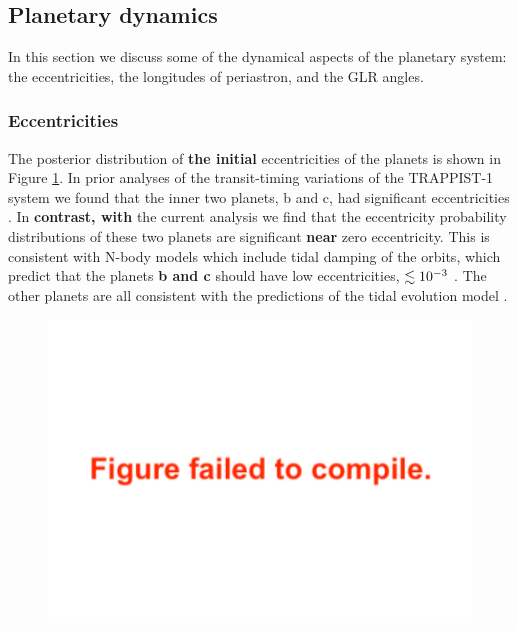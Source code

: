 \documentclass[twocolumn]{aastex63}
\begin{document}
\subsection{Planetary dynamics}



In this section we discuss some of the dynamical aspects of the planetary system: the  eccentricities, the longitudes of periastron, and the GLR angles.

\subsubsection{Eccentricities}

The posterior distribution of \textbf{the initial} eccentricities of the planets 
is shown in Figure \ref{fig:eccentricity_posterior}.  In prior analyses of
the transit-timing variations of the TRAPPIST-1 system we found that
the inner two planets, b and c, had significant eccentricities \citep{Grimm2018}.
In \textbf{contrast, with} the current analysis we find that the eccentricity probability
distributions of these two planets are significant \textbf{near} zero eccentricity.
This is consistent with N-body models which include tidal damping of
the orbits, which predict that the planets \textbf{b and c} should have low eccentricities,
$\lesssim 10^{-3}$ \citep{Luger2017a,Turbet2018}.  The other planets are
all consistent with the predictions of the tidal evolution model
\citep{Luger2017a}.

\begin{figure}
    \centering
    \includegraphics[width=\hsize]{figures/eccentricity_posterior.pdf}
    \label{fig:eccentricity_posterior}
\end{figure}
\end{document}
